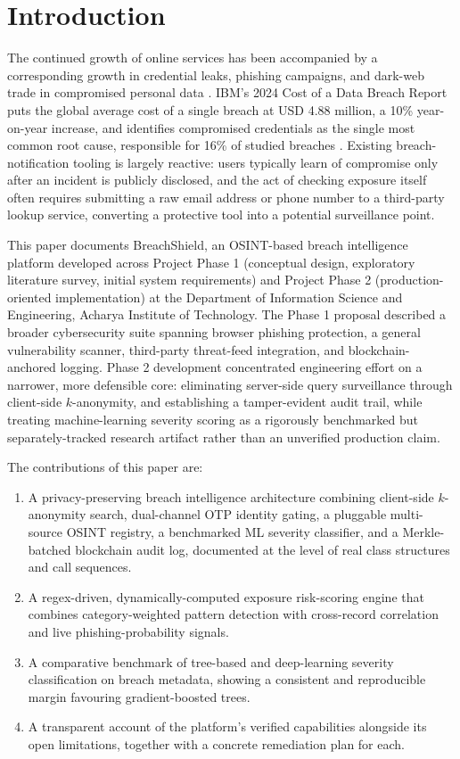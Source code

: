 \documentclass[conference]{IEEEtran}
\begin{document}
\section{Introduction}
The continued growth of online services has been accompanied by a corresponding growth in credential leaks, phishing campaigns, and dark-web trade in compromised personal data \cite{aljofey2020effective}. IBM's 2024 Cost of a Data Breach Report puts the global average cost of a single breach at USD 4.88 million, a 10\% year-on-year increase, and identifies compromised credentials as the single most common root cause, responsible for 16\% of studied breaches \cite{ibm2024cost}. Existing breach-notification tooling is largely reactive: users typically learn of compromise only after an incident is publicly disclosed, and the act of checking exposure itself often requires submitting a raw email address or phone number to a third-party lookup service, converting a protective tool into a potential surveillance point.

This paper documents BreachShield, an OSINT-based breach intelligence platform developed across Project Phase 1 (conceptual design, exploratory literature survey, initial system requirements) and Project Phase 2 (production-oriented implementation) at the Department of Information Science and Engineering, Acharya Institute of Technology. The Phase 1 proposal described a broader cybersecurity suite spanning browser phishing protection, a general vulnerability scanner, third-party threat-feed integration, and blockchain-anchored logging. Phase 2 development concentrated engineering effort on a narrower, more defensible core: eliminating server-side query surveillance through client-side $k$-anonymity, and establishing a tamper-evident audit trail, while treating machine-learning severity scoring as a rigorously benchmarked but separately-tracked research artifact rather than an unverified production claim.

The contributions of this paper are:
\begin{enumerate}
    \item A privacy-preserving breach intelligence architecture combining client-side $k$-anonymity search, dual-channel OTP identity gating, a pluggable multi-source OSINT registry, a benchmarked ML severity classifier, and a Merkle-batched blockchain audit log, documented at the level of real class structures and call sequences.
    \item A regex-driven, dynamically-computed exposure risk-scoring engine that combines category-weighted pattern detection with cross-record correlation and live phishing-probability signals.
    \item A comparative benchmark of tree-based and deep-learning severity classification on breach metadata, showing a consistent and reproducible margin favouring gradient-boosted trees.
    \item A transparent account of the platform's verified capabilities alongside its open limitations, together with a concrete remediation plan for each.
\end{enumerate}
\end{document}
